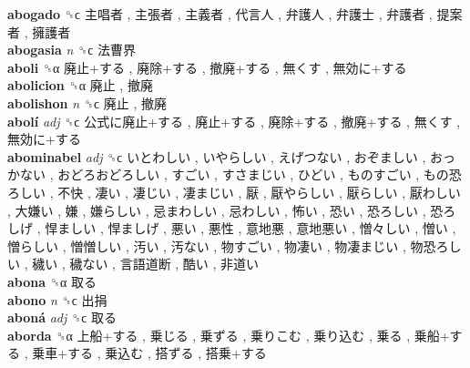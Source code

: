 \textbf{abogado} ␝ϲ   主唱者 ,  主張者 ,  主義者 ,  代言人 ,  弁護人 ,  弁護士 ,  弁護者 ,  提案者 ,  擁護者   \\
\textbf{abogasia} \emph{n}  ␝ϲ   法曹界   \\
\textbf{aboli} ␝α   廃止+する ,  廃除+する ,  撤廃+する ,  無くす ,  無効に+する   \\
\textbf{abolicion} ␝α   廃止 ,  撤廃   \\
\textbf{abolishon} \emph{n}  ␝ϲ   廃止 ,  撤廃   \\
\textbf{abolí} \emph{adj}  ␝ϲ   公式に廃止+する ,  廃止+する ,  廃除+する ,  撤廃+する ,  無くす ,  無効に+する   \\
\textbf{abominabel} \emph{adj}  ␝ϲ   いとわしい ,  いやらしい ,  えげつない ,  おぞましい ,  おっかない ,  おどろおどろしい ,  すごい ,  すさまじい ,  ひどい ,  ものすごい ,  もの恐ろしい ,  不快 ,  凄い ,  凄じい ,  凄まじい ,  厭 ,  厭やらしい ,  厭らしい ,  厭わしい ,  大嫌い ,  嫌 ,  嫌らしい ,  忌まわしい ,  忌わしい ,  怖い ,  恐い ,  恐ろしい ,  恐ろしげ ,  悍ましい ,  悍ましげ ,  悪い ,  悪性 ,  意地悪 ,  意地悪い ,  憎々しい ,  憎い ,  憎らしい ,  憎憎しい ,  汚い ,  汚ない ,  物すごい ,  物凄い ,  物凄まじい ,  物恐ろしい ,  穢い ,  穢ない ,  言語道断 ,  酷い ,  非道い   \\
\textbf{abona} ␝α   取る   \\
\textbf{abono} \emph{n}  ␝ϲ   出捐   \\
\textbf{aboná} \emph{adj}  ␝ϲ   取る   \\
\textbf{aborda} ␝α   上船+する ,  乗じる ,  乗ずる ,  乗りこむ ,  乗り込む ,  乗る ,  乗船+する ,  乗車+する ,  乗込む ,  搭ずる ,  搭乗+する   \\
